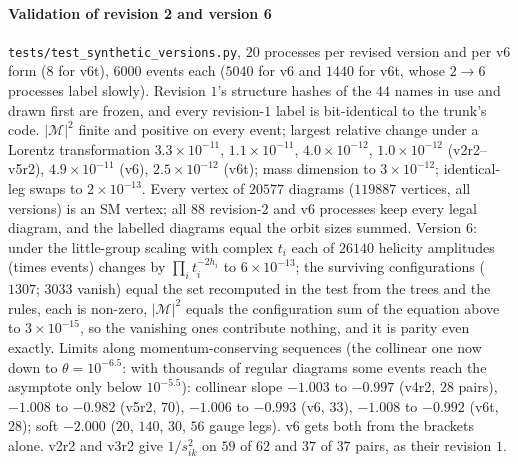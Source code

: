 \documentclass[11pt]{article}
\newcommand{\code}[1]{\texttt{#1}}
\begin{document}
\paragraph{Validation of revision 2 and version 6} \code{tests/test\_synthetic\_versions.py}, $20$ processes per revised version and per v6 form ($8$ for v6t), $6000$ events
each ($5040$ for v6 and $1440$ for v6t, whose $2\to6$ processes label slowly). Revision $1$'s structure hashes of the $44$ names
in use and drawn first are frozen, and every revision-$1$ label is bit-identical to the trunk's code. $|\mathcal M|^2$
finite and positive on every event; largest relative change under a Lorentz transformation $3.3\times10^{-11}$,
$1.1\times10^{-11}$, $4.0\times10^{-12}$, $1.0\times10^{-12}$ (v2r2--v5r2), $4.9\times10^{-11}$ (v6), $2.5\times10^{-12}$
(v6t); mass dimension to $3\times10^{-12}$; identical-leg swaps to $2\times10^{-13}$. Every vertex of $20577$ diagrams
($119887$ vertices, all versions) is an SM vertex; all $88$ revision-$2$ and v6 processes keep every legal diagram,
and the labelled diagrams equal the orbit sizes summed. Version $6$: under the little-group scaling with
complex $t_i$ each of $26140$ helicity amplitudes (times events) changes by $\prod_i t_i^{-2h_i}$ to $6\times10^{-13}$; the
surviving configurations ($1307$; $3033$ vanish) equal the set recomputed in the test from the trees and the rules,
each is non-zero, $|\mathcal M|^2$ equals the configuration sum of the equation above to $3\times10^{-15}$, so the
vanishing ones contribute nothing, and it is parity even exactly. Limits along momentum-conserving sequences (the
collinear one now down to $\theta=10^{-6.5}$: with thousands of regular diagrams some events reach the asymptote only
below $10^{-5.5}$): collinear slope $-1.003$ to $-0.997$ (v4r2, $28$ pairs), $-1.008$ to $-0.982$ (v5r2, $70$), $-1.006$
to $-0.993$ (v6, $33$), $-1.008$ to $-0.992$ (v6t, $28$); soft $-2.000$ ($20$, $140$, $30$, $56$ gauge legs). v6 gets both
from the brackets alone. v2r2 and v3r2 give $1/s_{ik}^2$ on $59$ of $62$ and $37$ of $37$ pairs, as their revision $1$.
\end{document}
